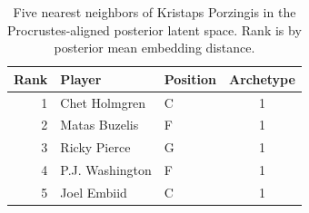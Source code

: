 \begin{table}[htbp]
  \centering\small
  \begin{tabular}{rllc}
    \toprule
    Rank & Player & Position & Archetype \\
    \midrule
    1 & Chet Holmgren & C & 1 \\
    2 & Matas Buzelis & F & 1 \\
    3 & Ricky Pierce & G & 1 \\
    4 & P.J. Washington & F & 1 \\
    5 & Joel Embiid & C & 1 \\
    \bottomrule
  \end{tabular}
  \caption{Five nearest neighbors of Kristaps Porzingis in the Procrustes-aligned posterior latent space. Rank is by posterior mean embedding distance.}
  \label{tab:Kristaps_Porzingis_neighbors}
\end{table}

